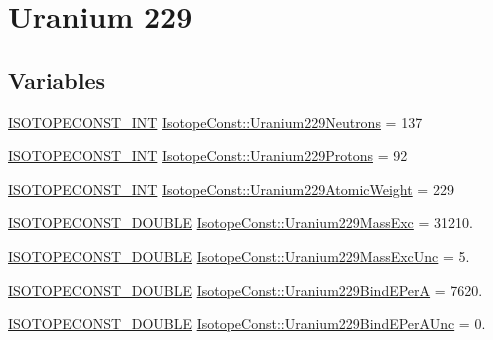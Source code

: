 \hypertarget{group___isotope_const-_uranium-_u229}{}\section{Uranium 229}
\label{group___isotope_const-_uranium-_u229}
\subsection*{Variables}
\begin{DoxyCompactItemize}
\item 
\mbox{\hyperlink{group___isotope_const-_macros_ga5f18360b3e99483a35c32d789e62621c}{I\+S\+O\+T\+O\+P\+E\+C\+O\+N\+S\+T\+\_\+\+I\+NT}} \mbox{\hyperlink{group___isotope_const-_uranium-_u229_ga48ef93a1c8811b3a1bc7760d553c3aa3}{Isotope\+Const\+::\+Uranium229\+Neutrons}} = 137
\item 
\mbox{\hyperlink{group___isotope_const-_macros_ga5f18360b3e99483a35c32d789e62621c}{I\+S\+O\+T\+O\+P\+E\+C\+O\+N\+S\+T\+\_\+\+I\+NT}} \mbox{\hyperlink{group___isotope_const-_uranium-_u229_ga756de2376ac55d23b08768d0ebcff8be}{Isotope\+Const\+::\+Uranium229\+Protons}} = 92
\item 
\mbox{\hyperlink{group___isotope_const-_macros_ga5f18360b3e99483a35c32d789e62621c}{I\+S\+O\+T\+O\+P\+E\+C\+O\+N\+S\+T\+\_\+\+I\+NT}} \mbox{\hyperlink{group___isotope_const-_uranium-_u229_gab3ffad34a2edbc78ccad2b7a966cb59f}{Isotope\+Const\+::\+Uranium229\+Atomic\+Weight}} = 229
\item 
\mbox{\hyperlink{group___isotope_const-_macros_ga8f45a7272ce02c0b4c65c44636ed719a}{I\+S\+O\+T\+O\+P\+E\+C\+O\+N\+S\+T\+\_\+\+D\+O\+U\+B\+LE}} \mbox{\hyperlink{group___isotope_const-_uranium-_u229_gab158a1851ca0c60764cc1b27b36971eb}{Isotope\+Const\+::\+Uranium229\+Mass\+Exc}} = 31210.
\item 
\mbox{\hyperlink{group___isotope_const-_macros_ga8f45a7272ce02c0b4c65c44636ed719a}{I\+S\+O\+T\+O\+P\+E\+C\+O\+N\+S\+T\+\_\+\+D\+O\+U\+B\+LE}} \mbox{\hyperlink{group___isotope_const-_uranium-_u229_ga4df4ffcd8267d8c575e4ed6a5eaf48ff}{Isotope\+Const\+::\+Uranium229\+Mass\+Exc\+Unc}} = 5.
\item 
\mbox{\hyperlink{group___isotope_const-_macros_ga8f45a7272ce02c0b4c65c44636ed719a}{I\+S\+O\+T\+O\+P\+E\+C\+O\+N\+S\+T\+\_\+\+D\+O\+U\+B\+LE}} \mbox{\hyperlink{group___isotope_const-_uranium-_u229_ga870fec73a6a29324dad7bddee53ecbd8}{Isotope\+Const\+::\+Uranium229\+Bind\+E\+PerA}} = 7620.
\item 
\mbox{\hyperlink{group___isotope_const-_macros_ga8f45a7272ce02c0b4c65c44636ed719a}{I\+S\+O\+T\+O\+P\+E\+C\+O\+N\+S\+T\+\_\+\+D\+O\+U\+B\+LE}} \mbox{\hyperlink{group___isotope_const-_uranium-_u229_ga763548f64bed280e210ced2d667b55cd}{Isotope\+Const\+::\+Uranium229\+Bind\+E\+Per\+A\+Unc}} = 0.

\end{DoxyCompactItemize}
